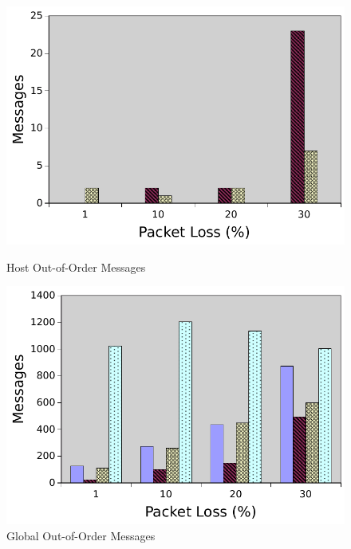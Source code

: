 \documentclass{llncs}
\begin{document}
\begin{figure}[ht]
\centering
\begin{minipage}[b]{0.48\linewidth}
\includegraphics[width = \textwidth]{figures/hooo.pdf}
\caption{Host Out-of-Order Messages}
\label{fig:hooo}
\end{minipage}
\quad
\begin{minipage}[b]{0.48\linewidth}
\includegraphics[width = \textwidth]{figures/gooo.pdf}
\caption{Global Out-of-Order Messages}
\label{fig:minipage2}
\end{minipage}
\end{figure}
\end{document}
